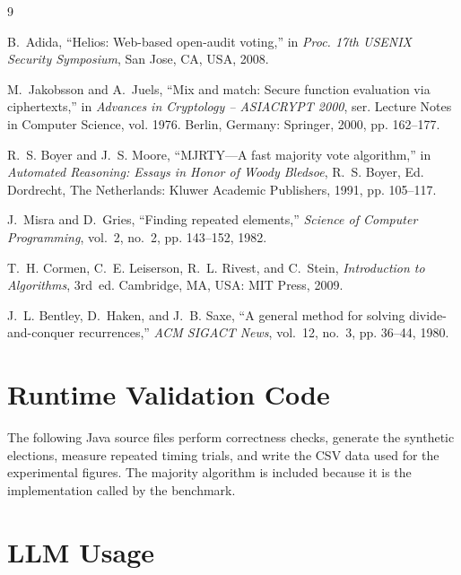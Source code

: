 \documentclass[conference]{IEEEtran}
\begin{document}
\begin{thebibliography}{9}

B.~Adida, ``Helios: Web-based open-audit voting,'' in \emph{Proc. 17th USENIX
Security Symposium}, San Jose, CA, USA, 2008.

M.~Jakobsson and A.~Juels, ``Mix and match: Secure function evaluation via
ciphertexts,'' in \emph{Advances in Cryptology -- ASIACRYPT 2000}, ser. Lecture
Notes in Computer Science, vol. 1976. Berlin, Germany: Springer, 2000,
pp. 162--177.

R.~S. Boyer and J.~S. Moore, ``MJRTY---A fast majority vote algorithm,'' in
\emph{Automated Reasoning: Essays in Honor of Woody Bledsoe}, R.~S. Boyer, Ed.
Dordrecht, The Netherlands: Kluwer Academic Publishers, 1991, pp. 105--117.

J.~Misra and D.~Gries, ``Finding repeated elements,'' \emph{Science of
Computer Programming}, vol.~2, no.~2, pp. 143--152, 1982.

T.~H. Cormen, C.~E. Leiserson, R.~L. Rivest, and C.~Stein, \emph{Introduction
to Algorithms}, 3rd~ed. Cambridge, MA, USA: MIT Press, 2009.

J.~L. Bentley, D.~Haken, and J.~B. Saxe, ``A general method for solving
divide-and-conquer recurrences,'' \emph{ACM SIGACT News}, vol.~12, no.~3,
pp. 36--44, 1980.

\end{thebibliography}

\appendices

\section{Runtime Validation Code}

The following Java source files perform correctness checks, generate the
synthetic elections, measure repeated timing trials, and write the CSV data
used for the experimental figures.  The majority algorithm is included
because it is the implementation called by the benchmark.




\section{LLM Usage}\label{app:llm}
\end{document}
